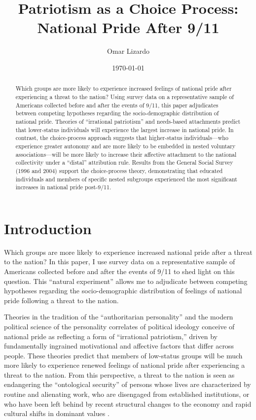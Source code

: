 \documentclass[12pt,letterpaper]{article}
\title{Patriotism as a Choice Process: National Pride After 9/11}
\author{Omar Lizardo}
\affil{UCLA}
\date{\today}
\begin{document}
\maketitle

\newpage
\begin{abstract}
Which groups are more likely to experience increased feelings of national pride after experiencing a threat to the nation? Using survey data on a representative sample of Americans collected before and after the events of 9/11, this paper adjudicates between competing hypotheses regarding the socio-demographic distribution of national pride. Theories of ``irrational patriotism'' and needs-based attachments predict that lower-status individuals will experience the largest increase in national pride. In contrast, the choice-process approach suggests that higher-status individuals---who experience greater autonomy and are more likely to be embedded in nested voluntary associations---will be more likely to increase their affective attachment to the national collectivity under a ``distal'' attribution rule. Results from the General Social Survey (1996 and 2004) support the choice-process theory, demonstrating that educated individuals and members of specific nested subgroups experienced the most significant increases in national pride post-9/11.
\end{abstract}

\newpage
\section{Introduction}

Which groups are more likely to experience increased national pride after a threat to the nation? In this paper, I use survey data on a representative sample of Americans collected before and after the events of 9/11 to shed light on this question. This ``natural experiment'' allows me to adjudicate between competing hypotheses regarding the socio-demographic distribution of feelings of national pride following a threat to the nation.

Theories in the tradition of the ``authoritarian personality'' \citep{adorno1950authoritarian-a52} and the modern political science of the personality correlates of political ideology \citep{jost2007are-871, jost2017ideology-f69, jost2008ideology-368} conceive of national pride as reflecting a form of ``irrational patriotism,'' driven by fundamentally ingrained motivational and affective factors that differ across people. These theories predict that members of low-status groups will be much more likely to experience renewed feelings of national pride after experiencing a threat to the nation. From this perspective, a threat to the nation is seen as endangering the ``ontological security'' \citep{giddens1984constitution} of persons whose lives are characterized by routine and alienating work, who are disengaged from established institutions, or who have been left behind by recent structural changes to the economy and rapid cultural shifts in dominant values \citep{wuthnow2019left-c34}.
\end{document}
